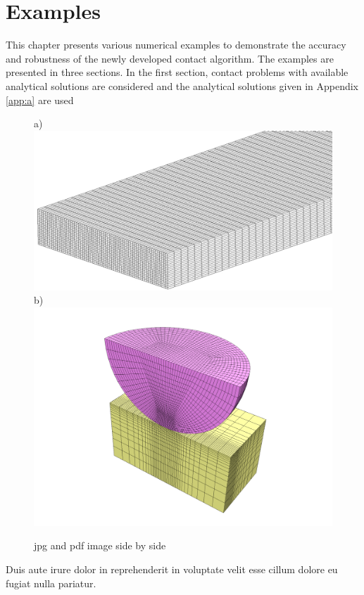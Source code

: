 \section{Examples}
\label{sec:ne:examples}
%
%
%
This chapter presents various numerical examples to demonstrate the accuracy and robustness of the newly developed contact algorithm. The examples are presented in three sections. In the first section, contact problems with available analytical solutions are considered and the analytical solutions given in Appendix \ref{app:a} are used
%
\begin{figure}[H]
\centering
a) \includegraphics[scale=0.11]{figures/mesh1.jpg} \qquad
b) \includegraphics[scale=0.11]{figures/sphereBlockMesh.pdf}
\caption{jpg and pdf image side by side}
\label{fig:Examples:sideBySide}
\end{figure}
Duis aute irure dolor in reprehenderit in voluptate velit esse cillum dolore eu fugiat nulla pariatur.
